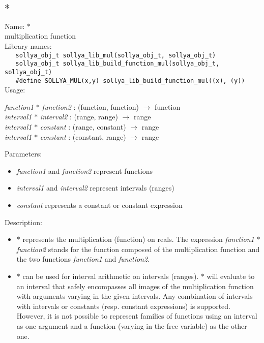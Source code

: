 \subsection{$*$}
\label{labmult}
\noindent Name: \textbf{$*$}\\
\phantom{aaa}multiplication function\\[0.2cm]
\noindent Library names:\\
\verb|   sollya_obj_t sollya_lib_mul(sollya_obj_t, sollya_obj_t)|\\
\verb|   sollya_obj_t sollya_lib_build_function_mul(sollya_obj_t, sollya_obj_t)|\\
\verb|   #define SOLLYA_MUL(x,y) sollya_lib_build_function_mul((x), (y))|\\[0.2cm]
\noindent Usage: 
\begin{center}
\emph{function1} \textbf{$*$} \emph{function2} : (\textsf{function}, \textsf{function}) $\rightarrow$ \textsf{function}\\
\emph{interval1} \textbf{$*$} \emph{interval2} : (\textsf{range}, \textsf{range}) $\rightarrow$ \textsf{range}\\
\emph{interval1} \textbf{$*$} \emph{constant} : (\textsf{range}, \textsf{constant}) $\rightarrow$ \textsf{range}\\
\emph{interval1} \textbf{$*$} \emph{constant} : (\textsf{constant}, \textsf{range}) $\rightarrow$ \textsf{range}\\
\end{center}
Parameters: 
\begin{itemize}
\item \emph{function1} and \emph{function2} represent functions
\item \emph{interval1} and \emph{interval2} represent intervals (ranges)
\item \emph{constant} represents a constant or constant expression
\end{itemize}
\noindent Description: \begin{itemize}

\item \textbf{$*$} represents the multiplication (function) on reals. 
   The expression \emph{function1} \textbf{$*$} \emph{function2} stands for
   the function composed of the multiplication function and the two
   functions \emph{function1} and \emph{function2}.

\item \textbf{$*$} can be used for interval arithmetic on intervals
   (ranges). \textbf{$*$} will evaluate to an interval that safely
   encompasses all images of the multiplication function with arguments varying
   in the given intervals.  Any combination of intervals with intervals
   or constants (resp. constant expressions) is supported. However, it is
   not possible to represent families of functions using an interval as
   one argument and a function (varying in the free variable) as the
   other one.
\end{itemize}
